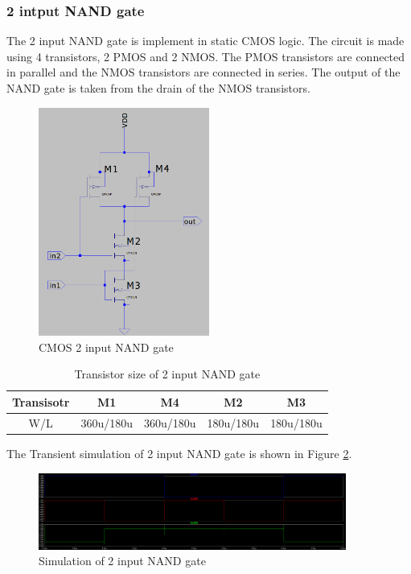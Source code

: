 \subsubsection{2 intput NAND gate}
The 2 input NAND gate is implement in static CMOS logic. The circuit is made using 4 transistors, 2 PMOS and 2 NMOS. The PMOS transistors are connected in parallel and the NMOS transistors are connected in series. The output of the NAND gate is taken from the drain of the NMOS transistors.

\begin{figure}[H]
	\centering
	\includegraphics[width=0.5\textwidth]{figs/2nand_circuit.png}
	\caption{CMOS 2 input NAND gate}
	\label{fig:2nand_circuit}
	\vspace{0.5cm}
\end{figure}
\begin{table}[H]
\centering
\begin{tabular}{|c|c|c|c|c|}
\hline
Transisotr & M1 & M4 & M2 & M3 \\
\hline
W/L & 360u/180u & 360u/180u & 180u/180u & 180u/180u  \\
\hline
\end{tabular}
\caption{Transistor size of 2 input NAND gate}
\label{tab:2nand_size}
\vspace{0.5cm}
\end{table}
The Transient simulation of 2 input NAND gate is shown in Figure \ref{fig:2nand_output}.
\begin{figure}[H]
	\centering
	\includegraphics[width=0.9\textwidth]{figs/nand2op.png}
	\caption{Simulation of 2 input NAND gate}
	\label{fig:2nand_output}
	\vspace{0.5cm}
\end{figure}

